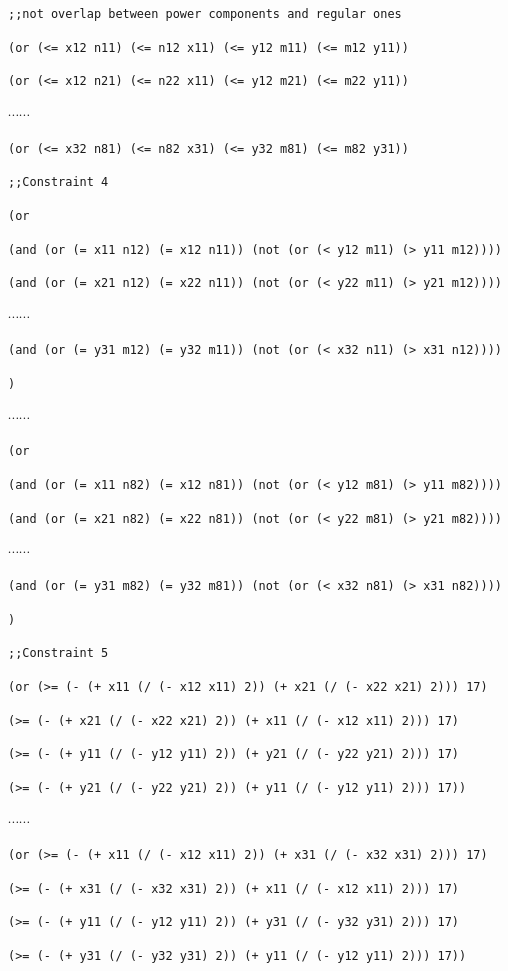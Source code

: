 \documentclass[11pt]{article}
\begin{document}
{{{\tt ;;not overlap between power components and regular ones}

{\tt (or (<= x12 n11) (<= n12 x11) (<= y12 m11) (<= m12 y11))}

{\tt (or (<= x12 n21) (<= n22 x11) (<= y12 m21) (<= m22 y11))}

$\cdots \cdots$

{\tt (or (<= x32 n81) (<= n82 x31) (<= y32 m81) (<= m82 y31))}

{\tt ;;Constraint 4}

{\tt (or}

{\tt (and (or (= x11 n12) (= x12 n11)) (not (or (< y12 m11) (> y11 m12))))}

{\tt (and (or (= x21 n12) (= x22 n11)) (not (or (< y22 m11) (> y21 m12))))}

$\cdots \cdots$

{\tt (and (or (= y31 m12) (= y32 m11)) (not (or (< x32 n11) (> x31 n12))))}

{\tt )}

$\cdots \cdots$

{\tt (or}

{\tt (and (or (= x11 n82) (= x12 n81)) (not (or (< y12 m81) (> y11 m82))))}

{\tt (and (or (= x21 n82) (= x22 n81)) (not (or (< y22 m81) (> y21 m82))))}

$\cdots \cdots$

{\tt (and (or (= y31 m82) (= y32 m81)) (not (or (< x32 n81) (> x31 n82))))}

{\tt )}

{\tt ;;Constraint 5}

{\tt (or (>= (- (+ x11 (/ (- x12 x11) 2)) (+ x21 (/ (- x22 x21) 2))) 17)}

{\tt (>= (- (+ x21 (/ (- x22 x21) 2)) (+ x11 (/ (- x12 x11) 2))) 17)}

{\tt (>= (- (+ y11 (/ (- y12 y11) 2)) (+ y21 (/ (- y22 y21) 2))) 17)}

{\tt (>= (- (+ y21 (/ (- y22 y21) 2)) (+ y11 (/ (- y12 y11) 2))) 17))}

$\cdots \cdots$

{\tt (or (>= (- (+ x11 (/ (- x12 x11) 2)) (+ x31 (/ (- x32 x31) 2))) 17)}

{\tt (>= (- (+ x31 (/ (- x32 x31) 2)) (+ x11 (/ (- x12 x11) 2))) 17)}

{\tt (>= (- (+ y11 (/ (- y12 y11) 2)) (+ y31 (/ (- y32 y31) 2))) 17)}

{\tt (>= (- (+ y31 (/ (- y32 y31) 2)) (+ y11 (/ (- y12 y11) 2))) 17))}

}}
\end{document}
